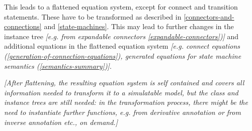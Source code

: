 This leads to a flattened equation system, except for connect and
transition statements. These have to be transformed as described in
\ref{connectors-and-connections} and \ref{state-machines}. This may lead to further changes in the
instance tree \emph{{[}e.g. from expandable connectors \ref{expandable-connectors}){]}} 
and additional equations in the flattened equation
system \emph{{[}e.g. connect equations (\ref{generation-of-connection-equations}), generated
equations for state machine semantics (\ref{semantics-summary}){]}}.

\emph{{[}After flattening, the resulting equation system is self
contained and covers all information needed to transform it to a
simulatable model, but the class and instance trees are still needed: in
the transformation process, there might be the need to instantiate
further functions, e.g. from derivative annotation or from inverse
annotation etc., on demand.{]}}
